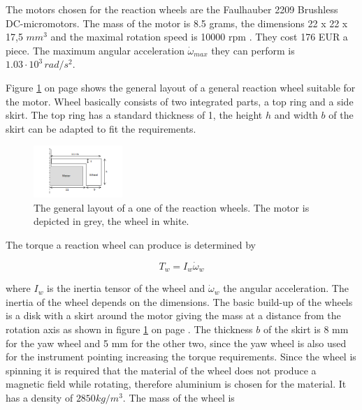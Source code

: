 The motors chosen for the reaction wheels are the Faulhauber 2209 Brushless DC-micromotors. The mass of the motor is 8.5 grams, the dimensions 22 x 22 x 17,5 $mm^3$ and the maximal rotation speed is 10000 rpm \cite{faulhaber}. They cost 176 EUR a piece. The maximum angular acceleration $\dot{\omega}_{max}$ they can perform is $1.03\cdot 10^3\,rad/s^2$. 

Figure \ref{fig:wheel} on page \pageref{fig:wheel} shows the general layout of a general reaction wheel suitable for the motor. Wheel basically consists of two integrated parts, a top ring and a side skirt. The top ring has a standard thickness of 1, the height $h$ and width $b$ of the skirt can be adapted to fit the requirements. 

\begin{figure}
\centering
\includegraphics[width=0.3\textwidth]{chapters/img/reactionwheel.png}
\caption[Basic reaction wheel]{The general layout of a one of the reaction wheels. The motor is depicted in grey, the wheel in white.}
\label{fig:wheel}
\end{figure}

The torque a reaction wheel can produce is determined by

\begin{equation}
T_w = I_w \dot{\omega}_w
\label{wheeltorque}
\end{equation}

where $I_w$ is the inertia tensor of the wheel and $\dot{\omega}_w$ the angular acceleration. The inertia of the wheel depends on the dimensions.  The basic build-up of the wheels is a disk with a skirt around the motor giving the mass at a distance from the rotation axis as shown in figure \ref{fig:wheel} on page \pageref{fig:wheel}. The thickness $b$ of the skirt is 8 mm for the yaw wheel and 5 mm for the other two, since the yaw wheel is also used for the instrument pointing increasing the torque requirements. Since the wheel is spinning it is required that the material of the wheel does not produce a magnetic field while rotating, therefore aluminium is chosen for the material. It has a density of $2850 kg/m^3$. The mass of the wheel is 

